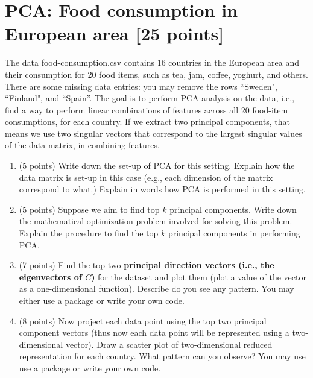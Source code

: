 \documentclass[twoside,10pt]{article}
\begin{document}
\section{PCA: Food consumption in European area [25 points]}

The data \textsf{food-consumption.csv} contains 16 countries in the European area and their consumption for 20 food items, such as tea, jam, coffee, yoghurt, and others. There are some missing data entries: you may remove the rows ``Sweden", ``Finland", and ``Spain''. The goal is to perform PCA analysis on the data, i.e., find a way to perform linear combinations of features across all 20 food-item consumptions, for each country. If we extract two principal components, that means we use two singular vectors that correspond to the largest singular values of the data matrix, in combining features. 
\begin{enumerate}
\item (5 points) Write down the set-up of PCA for this setting. Explain how the data matrix is set-up in this case (e.g., each dimension of the matrix correspond to what.) Explain in words how PCA is performed in this setting. 
\item (5 points) Suppose we aim to find top $k$ principal components. Write down the mathematical optimization problem involved for solving this problem. Explain the procedure to find the top $k$ principal components in performing PCA. 
\item (7 points) Find the top two {\bf principal direction vectors (i.e., the eigenvectors of $C$)} for the dataset and plot them (plot a value of the vector as a one-dimensional function). Describe do you see any pattern. You may either use a package or write your own code. 
\item (8 points) Now project each data point using the top two principal component vectors (thus now each data point will be represented using a two-dimensional vector). Draw a scatter plot of two-dimensional reduced representation for each country. What pattern can you observe? You may use use a package or write your own code. 
\end{enumerate}
\end{document}
